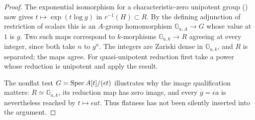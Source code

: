 \begin{proof}
The exponential isomorphism for a characteristic-zero
unipotent group
(\citealp[Proposition 14.32]{D_Milne2022}) now gives
$t\mapsto\exp(t\log g)$ in $r^{-1}(H)\subset R$.
By the defining adjunction of restriction of scalars
this is an $A$-group homomorphism $\mathbb G_{a,A}\to G$
whose value at $1$ is $g$.
Two such maps correspond to $k$-morphisms
$\mathbb G_{a,k}\to R$ agreeing at every integer, since both
take $n$ to $g^n$. The integers are Zariski dense
in $\mathbb G_{a,k}$, and $R$ is separated; the maps agree.
For quasi-unipotent reduction first take a power
whose reduction is unipotent and apply the result.

The nonflat test $G=\operatorname{Spec} A[t]/(\epsilon t)$
illustrates why the image qualification matters:
$R\simeq\mathbb G_{a,k}$, its reduction map has zero image,
and every $g=\epsilon a$ is nevertheless reached
by $t\mapsto\epsilon at$. Thus flatness has not
been silently inserted into the argument.
\end{proof}
